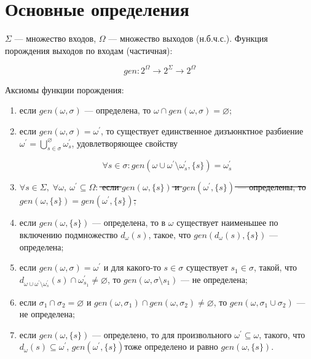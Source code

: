 \section{Основные определения}

$\Sigma$ --- множество входов, $\Omega$ --- множество выходов (н.б.ч.с.). Функция порождения
выходов по входам (частичная):

$$
gen : 2^\Omega\to 2^\Sigma\to 2^\Omega
$$

Аксиомы функции порождения:

\begin{enumerate}
	\item если $gen(\omega,\sigma)$ --- определена, то $\omega\cap gen(\omega,\sigma)=\varnothing$;
	\item если $gen(\omega,\sigma)=\omega^\prime$, то существует единственное дизъюнктное разбиение $\omega^\prime=\bigcup^\varnothing_{s\in\sigma}\omega^\prime_s$, 
	удовлетворяющее свойству 

	$$\forall s\in\sigma : gen(\omega\cup\omega^\prime\setminus\omega^\prime_s,\{s\})=\omega^\prime_s$$

	\item \sout{$\forall s\in\Sigma,\; \forall\omega,\:\omega^\prime\subseteq\Omega:$ если $gen(\omega,\{s\})$ и $gen(\omega^\prime,\{s\})$ ---
	определены, то $gen(\omega,\{s\})=gen(\omega^\prime,\{s\})$;}

	\item если $gen(\omega,\{s\})$ --- определена, то в $\omega$ существует наименьшее по включению подмножество $d_\omega(s)$, такое, что
	$gen(d_\omega(s), \{s\})$ --- определена;

	\item если $gen(\omega,\sigma)=\omega^\prime$ и для какого-то $s\in\sigma$ существует $s_1\in\sigma$, такой, что
	$d_{\omega\cup\omega^\prime\setminus\omega^\prime_s}(s) \cap \omega^\prime_{s_1}\ne\varnothing$, 
	то $gen(\omega,\sigma\setminus s_1)$ --- не определена;

	\item если $\sigma_1\cap\sigma_2 = \varnothing$ и $gen(\omega,\sigma_1)\cap gen(\omega,\sigma_2)\ne\varnothing$, то $gen(\omega,\sigma_1\cup\sigma_2)$ --- не определена;
	
	\item если $gen(\omega,\{s\})$ --- определено, то для произвольного $\omega^\prime\subseteq\omega$, такого, что $d_\omega(s)\subseteq\omega^\prime$, $gen(\omega^\prime, \{s\})$тоже определено и равно $gen(\omega,\{s\})$.
\end{enumerate}